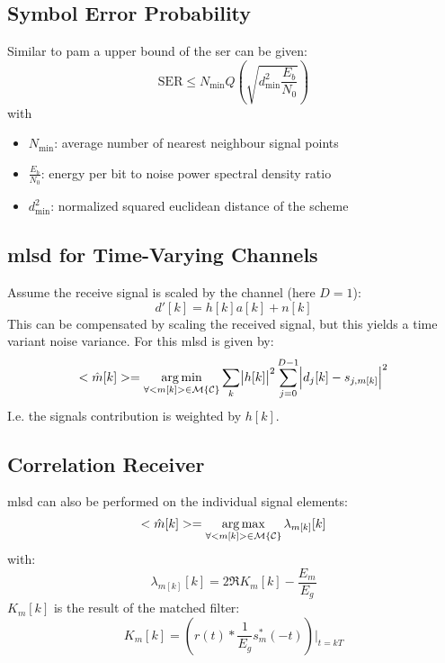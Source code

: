 \subsection{Symbol Error Probability}
Similar to \ac{pam} a upper bound of the \ac{ser} can be given:
\begin{equation}
    \text{SER} \leq N_\text{min} Q\left(\sqrt{d_\text{min}^2 \frac{E_b}{N_0}}\right)
\end{equation}
with
\begin{itemize}
    \item $N_\text{min}$: average number of nearest neighbour signal points
    \item $\frac{E_b}{N_0}$: energy per bit to noise power spectral density ratio
    \item $d_\text{min}^2$: normalized squared euclidean distance of the scheme
\end{itemize}

\subsection{\acl{mlsd} for Time-Varying Channels}
Assume the receive signal is scaled by the channel (here $D=1$):
\begin{equation}
    d'[k] =h[k] a[k] + n[k]
\end{equation}
This can be compensated by scaling the received signal, but this yields a time variant
noise variance. For this \ac{mlsd} is given by:
\begin{equation}
    <\hat{m}[k]> = \operatorname*{arg\,min}_{\forall <m[k]> \in \mathcal{M}\{\mathcal{C}\}}
        \sum_k \abs{h[k]}^2 \sum_{j=0}^{D-1} \abs{d_j[k] - s_{j,m[k]}}^2
\end{equation}
I.e. the signals contribution is weighted by $h[k]$.

\subsection{Correlation Receiver}
\ac{mlsd} can also be performed on the individual signal elements:
\begin{equation}
    <\hat{m}[k]> = \operatorname*{arg\,max}_{\forall <m[k]> \in \mathcal{M}\{\mathcal{C}\}}
        \lambda_{m[k]}[k]
\end{equation}
with:
\begin{equation}
    \lambda_{m[k]}[k] = 2 \Re{K_m[k]} - \frac{E_m}{E_g}
\end{equation}
$K_m[k]$ is the result of the matched filter:
\begin{equation}
    K_m[k] = \left(r(t) * \frac{1}{E_g} s^*_m(-t)\right) \vert_{t=kT}
\end{equation}

